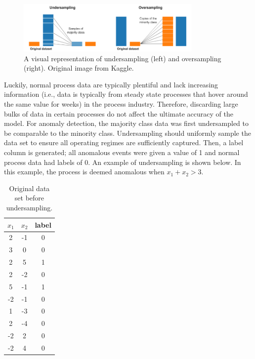 \begin{figure}[H]
    \centering
    \includegraphics[width=0.8\textwidth]{images/ch3/over_and_undersampling.jpeg}
    \caption{A visual representation of undersampling (left) and oversampling (right). Original image from Kaggle.}
    \label{fig:03under_over_sampling}
\end{figure}

Luckily, normal process data are typically plentiful and lack increasing information (i.e., data is typically from steady state processes that hover around the same value for weeks) in the process industry.  Therefore, discarding large bulks of data in certain processes do not affect the ultimate accuracy of the model.  For anomaly detection, the majority class data was first undersampled to be comparable to the minority class. Undersampling should uniformly sample the data set to ensure all operating regimes are sufficiently captured. Then, a label column is generated; all anomalous events were given a value of 1 and normal process data had labels of 0.  An example of undersampling is shown below.  In this example, the process is deemed anomalous when $x_1 + x_2 > 3$.

\begin{table}[H]
    \centering
    \begin{tabular}{ c | c | c }
        $x_1$ & $x_2$ & label \\
        \hline
        2 & -1 & 0 \\
        3 & 0 & 0 \\
        2 & 5 & 1 \\
        2 & -2 & 0 \\
        5 & -1 & 1 \\
        -2 & -1 & 0 \\
        1 & -3 & 0 \\
        2 & -4 & 0 \\
        -2 & 2 & 0 \\
        -2 & 4 & 0 \\
    \end{tabular}
    \caption{Original data set before undersampling.}
    \label{tab:03undersampling}
\end{table}

